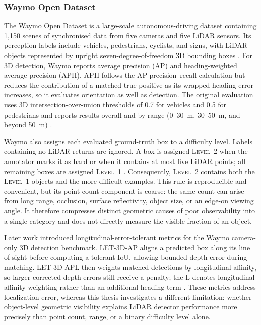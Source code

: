 \documentclass[12pt,a4paper]{article}
\begin{document}
\subsubsection{Waymo Open Dataset}

The Waymo Open Dataset is a large-scale autonomous-driving dataset containing 1,150 scenes of synchronised data from five cameras and five LiDAR sensors. Its perception labels include vehicles, pedestrians, cyclists, and signs, with LiDAR objects represented by upright seven-degree-of-freedom 3D bounding boxes \cite{bib_ref_1}. For 3D detection, Waymo reports average precision (AP) and heading-weighted average precision (APH). APH follows the AP precision--recall calculation but reduces the contribution of a matched true positive as its wrapped heading error increases, so it evaluates orientation as well as detection. The original evaluation uses 3D intersection-over-union thresholds of 0.7 for vehicles and 0.5 for pedestrians and reports results overall and by range (0--30~m, 30--50~m, and beyond 50~m) \cite{bib_ref_1}.

Waymo also assigns each evaluated ground-truth box to a difficulty level. Labels containing no LiDAR returns are ignored. A box is assigned \textsc{Level~2} when the annotator marks it as hard or when it contains at most five LiDAR points; all remaining boxes are assigned \textsc{Level~1} \cite{bib_ref_1}. Consequently, \textsc{Level~2} contains both the \textsc{Level~1} objects and the more difficult examples. This rule is reproducible and convenient, but its point-count component is coarse: the same count can arise from long range, occlusion, surface reflectivity, object size, or an edge-on viewing angle. It therefore compresses distinct geometric causes of poor observability into a single category and does not directly measure the visible fraction of an object.

Later work introduced longitudinal-error-tolerant metrics for the Waymo camera-only 3D detection benchmark. LET-3D-AP aligns a predicted box along its line of sight before computing a tolerant IoU, allowing bounded depth error during matching. LET-3D-APL then weights matched detections by longitudinal affinity, so larger corrected depth errors still receive a penalty; the L denotes longitudinal-affinity weighting rather than an additional heading term \cite{bib_ref_30}. These metrics address localization error, whereas this thesis investigates a different limitation: whether object-level geometric visibility explains LiDAR detector performance more precisely than point count, range, or a binary difficulty level alone.
\end{document}
